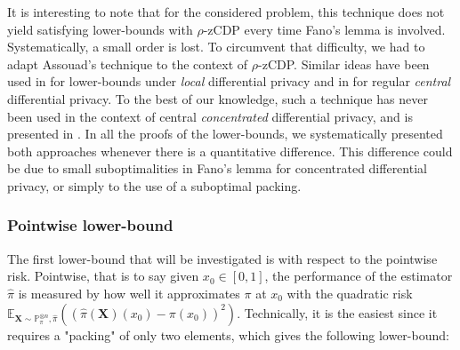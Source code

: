 \documentclass[10pt]{article} %
\newcommand{\Prob}[0]{\mathbb{P}}
\newcommand{\E}[0]{\mathbb{E}}
\newcommand\vect[1]{\mathbf{#1}}
\newcommand\p[1]{\left( {#1}\right)}
\newcommand\B[1]{{#1}}
\begin{document}
It is interesting to note that for the considered problem, this technique does not yield satisfying lower-bounds with $\rho$-zCDP every time Fano's lemma is involved. Systematically, a small order is lost. To circumvent that difficulty, we had to adapt Assouad's technique to the context of $\rho$-zCDP. Similar ideas have been used in \citet{duchi2018minimax} for lower-bounds under \emph{local} differential privacy and in \citet{acharya2021differentially} for regular \emph{\B{central}} differential privacy. To the best of our knowledge, such a technique has never been used in the context of \B{central} \emph{concentrated} differential privacy, and is presented in . In all the proofs of the lower-bounds, we systematically presented both approaches whenever there is a quantitative difference. This difference could be due to small suboptimalities in Fano's lemma for concentrated differential privacy, or simply to the use of a suboptimal packing.


\subsubsection{Pointwise lower-bound}

The first lower-bound that will be investigated is with respect to the pointwise risk. Pointwise, that is to say given
$x_0 \in [0, 1]$, the performance of the estimator $\hat{\pi}$ is measured by how well it approximates $\pi$ at $x_{0}$ with the quadratic risk $\E_{\vect{X} \sim \Prob_{\pi}^{\otimes n}, \hat{\pi}}\p{\p{\hat{\pi}(\vect{X})(x_0) - \pi(x_0)}^2}$.
%
Technically, it is the easiest since it requires a "packing" of only two elements, which gives the following lower-bound:
\end{document}
